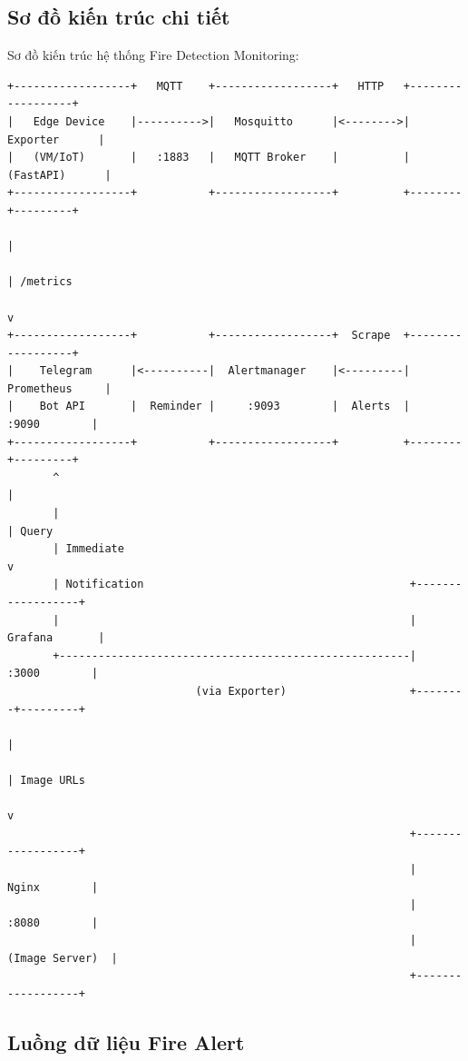 \documentclass[12pt,a4paper]{report}
\begin{document}
\subsection{Sơ đồ kiến trúc chi tiết}

Sơ đồ kiến trúc hệ thống Fire Detection Monitoring:
\begin{verbatim}
+------------------+   MQTT    +------------------+   HTTP   +------------------+
|   Edge Device    |---------->|   Mosquitto      |<-------->|    Exporter      |
|   (VM/IoT)       |   :1883   |   MQTT Broker    |          |   (FastAPI)      |
+------------------+           +------------------+          +--------+---------+
                                                                      |
                                                                      | /metrics
                                                                      v
+------------------+           +------------------+  Scrape  +------------------+
|    Telegram      |<----------|  Alertmanager    |<---------|   Prometheus     |
|    Bot API       |  Reminder |     :9093        |  Alerts  |     :9090        |
+------------------+           +------------------+          +--------+---------+
       ^                                                              |
       |                                                              | Query
       | Immediate                                                    v
       | Notification                                         +------------------+
       |                                                      |    Grafana       |
       +------------------------------------------------------|     :3000        |
                             (via Exporter)                   +--------+---------+
                                                                       |
                                                                       | Image URLs
                                                                       v
                                                              +------------------+
                                                              |     Nginx        |
                                                              |     :8080        |
                                                              |  (Image Server)  |
                                                              +------------------+
\end{verbatim}

\subsection{Luồng dữ liệu Fire Alert}
\end{document}
